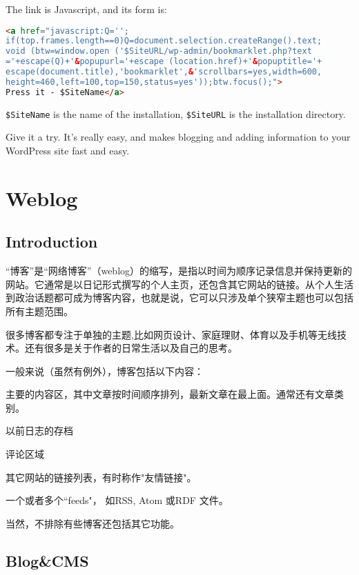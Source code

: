 The link is Javascript, and its form is:

\begin{lstlisting}[language=HTML]
<a href="javascript:Q='';
if(top.frames.length==0)Q=document.selection.createRange().text;
void (btw=window.open ('$SiteURL/wp-admin/bookmarklet.php?text
='+escape(Q)+'&popupurl='+escape (location.href)+'&popuptitle='+
escape(document.title),'bookmarklet',&'scrollbars=yes,width=600,
height=460,left=100,top=150,status=yes'));btw.focus();">
Press it - $SiteName</a>
\end{lstlisting}

\verb|$SiteName| is the name of the installation, \verb|$SiteURL| is the installation directory.

Give it a try. It's really easy, and makes blogging and adding information to your WordPress site fast and easy.






\chapter{Weblog}

\section{Introduction}

“博客”是“网络博客”（weblog）的缩写，是指以时间为顺序记录信息并保持更新的网站。它通常是以日记形式撰写的个人主页，还包含其它网站的链接。从个人生活到政治话题都可成为博客内容，也就是说，它可以只涉及单个狭窄主题也可以包括所有主题范围。

很多博客都专注于单独的主题,比如网页设计、家庭理财、体育以及手机等无线技术。还有很多是关于作者的日常生活以及自己的思考。

一般来说（虽然有例外），博客包括以下内容：
\begin{compactitem}
\item 主要的内容区，其中文章按时间顺序排列，最新文章在最上面。通常还有文章类别。
\item 以前日志的存档
\item 评论区域
\item 其它网站的链接列表，有时称作"友情链接"。
\item 一个或者多个``feeds"， 如RSS, Atom 或RDF 文件。
\end{compactitem}

当然，不排除有些博客还包括其它功能。

\section{Blog\&CMS}

